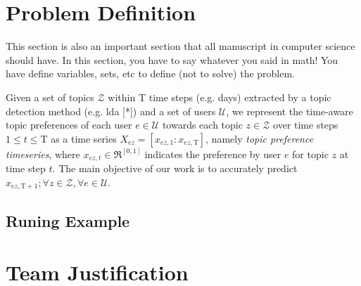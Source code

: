 \documentclass[sigconf]{acmart}
\begin{document}
\section{Problem Definition}
{\color{blue}This section is also an important section that all manuscript in computer science should have. In this section, you have to say whatever you said in math! You have define variables, sets, etc to define (not to solve) the problem. }

Given a set of topics $\mathcal{Z}$ within T time steps (e.g. days) extracted by a topic detection method (e.g. lda [*]) and a set of users $\mathcal{U}$, we represent the time-aware topic preferences of each user $e\in \mathcal{U}$ towards each topic $z\in \mathcal{Z}$ over time steps  $1\leq t \leq \text{T}$  as a time series $X_{ez} = [x_{ez,1} : x_{ez,\text{T}}]$, namely \textit{topic preference timeseries}, where $x_{ez,t}\in\mathfrak{R}^{[0,1]}$ indicates the preference by user $e$ for topic $z$ at time step $t$. The main objective of our work is to accurately predict $x_{ez,\text{T}+1}; \forall z\in\mathcal{Z}, \forall e\in\mathcal{U}$.

\subsection{Runing Example}

\section{Team Justification}



\end{document}
